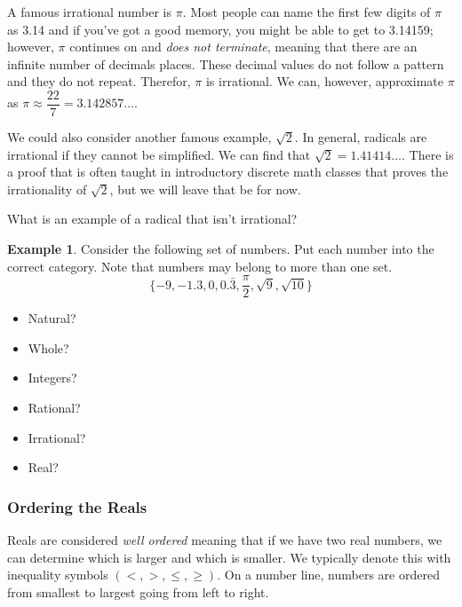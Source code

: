 \documentclass[addpoints,12pt]{exam}
\theoremstyle{definition}
\newtheorem{example}{Example}[subsection]
\begin{document}
\vspace{.25in}

\noindent A famous irrational number is $\pi$. Most people can name the first few digits of $\pi$ as 3.14 and if you've got a good memory, you might be able to get to 3.14159; however, $\pi$ continues on and \emph{does not terminate}, meaning that there are an infinite number of decimals places. These decimal values do not follow a pattern and they do not repeat. Therefor, $\pi$ is irrational. We can, however, approximate $\pi$ as $\pi \approx \dfrac{22}{7} = 3.142857\dots$.

\vspace{.25in}

\noindent We could also consider another famous example, $\sqrt{2}$. In general, radicals are irrational if they cannot be simplified. We can find that $\sqrt{2} = 1.41414\dots$. There is a proof that is often taught in introductory discrete math classes that proves the irrationality of $\sqrt{2}$, but we will leave that be for now.

\vspace{.25in}

\noindent What is an example of a radical that isn't irrational?

\vspace{.5in}

\begin{example}
Consider the following set of numbers. Put each number into the correct category. Note that numbers may belong to more than one set.
\[\{-9,-1.3,0,0.\bar{3},\dfrac{\pi}{2},\sqrt{9},\sqrt{10}\}\]

\begin{itemize}
\item Natural?
\item Whole?
\item Integers?
\item Rational?
\item Irrational?
\item Real?
\end{itemize}
\end{example}

\subsubsection*{Ordering the Reals}

\noindent Reals are considered \emph{well ordered} meaning that if we have two real numbers, we can determine which is larger and which is smaller. We typically denote this with inequality symbols $(<, >, \le, \ge)$. On a number line, numbers are ordered from smallest to largest going from left to right.
\end{document}
